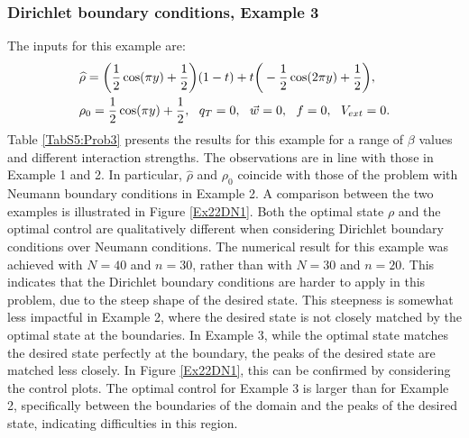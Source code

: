 \subsubsection{Dirichlet boundary conditions, Example 3} 
The inputs for this example are:
\begin{align*}
&\widehat \rho = \bigg(\frac{1}{2}\cos(\pi y) + \frac{1}{2}\bigg)(1-t) + t\bigg(-\frac{1}{2}\cos(2 \pi y) + \frac{1}{2}\bigg),\\
&\rho_{0} = \frac{1}{2}\cos(\pi y) + \frac{1}{2},\ \
q_{T} = 0,\ \
\vec{w} = 0,\ \
f =0,\ \
V_{ext} =0.
\end{align*}
Table \ref{TabS5:Prob3} presents the results for this example for a range of $\beta$ values and different interaction strengths. The observations are in line with those in Example 1 and 2. In particular, $ \widehat \rho$ and $\rho_0$ coincide with those of the problem with Neumann boundary conditions in Example 2. A comparison between the two examples is illustrated in Figure \ref{Ex22DN1}. Both the optimal state $\rho$ and the optimal control are qualitatively different when considering Dirichlet boundary conditions over Neumann conditions. The numerical result for this example was achieved with $N=40$ and $n = 30$, rather than with $N=30$ and $n=20$. This indicates that the Dirichlet boundary conditions are harder to apply in this problem, due to the steep shape of the desired state. This steepness is somewhat less impactful in Example 2, where the desired state is not closely matched by the optimal state at the boundaries. In Example 3, while the optimal state matches the desired state perfectly at the boundary, the peaks of the desired state are matched less closely. In Figure \ref{Ex22DN1}, this can be confirmed by considering the control plots. The optimal control for Example 3 is larger than for Example 2, specifically between the boundaries of the domain and the peaks of the desired state, indicating difficulties in this region.
